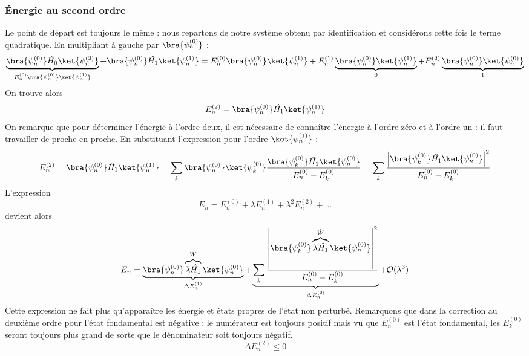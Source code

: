 		\subsubsection{Énergie au second ordre}
		Le point de départ est toujours le même :  nous repartons de notre 
		système obtenu par identification et considérons cette fois le terme
		quadratique. En multipliant à gauche par $\bra{\psi_n^{(0)}}$ :
		\begin{equation}
		\underbrace{\bra{\psi_n^{(0)}}\hat{H_0}\ket{\psi_n^{(2)}}}_{E_n^{(0
		)}\bra{\psi_n^{(0)}}\ket{\psi_n^{(1)}}}+\bra{\psi_n^{(0)}}\hat{H_1}\ket{\psi_n^{(1)}} =
		 E_n^{(0	)}\bra{\psi_n^{(0)}}\ket{\psi_n^{(1)}}+E_n^{(1)}\underbrace{
		 \bra{\psi_n^{(0)}}\ket{\psi_n^{(1)}}}_{0}+E_n^{(2)}
		\underbrace{\bra{\psi_n^{(0)}}\ket{\psi_n^{(0)}}}_{1}
		\end{equation}
		On trouve alors
		\begin{equation}
		E_n^{(2)} = \bra{\psi_n^{(0)}}\hat{H_1}\ket{\psi_n^{(1)}}
		\end{equation}
		On remarque que pour déterminer l'énergie à l'ordre deux, il est nécessaire de 
		connaître l'énergie à l'ordre zéro et à l'ordre un : il faut travailler de proche
		en proche. En substituant l'expression pour l'ordre $\ket{\psi_n^{(1)}}$ : 
		\begin{equation}
		E_n^{(2)} = \bra{\psi_n^{(0)}}\hat{H_1}\ket{\psi_n^{(1)}} = \sum_k
		\bra{\psi_n^{(0)}}\ket{\psi_k^{(0)}}
		\dfrac{\bra{\psi_k^{(0)}}\hat{H_1}\ket{\psi_n^{(0)}}}{	E_n^{(0)}-E_k^{(0)}} =
		\sum_k \dfrac{\left|\bra{\psi_k^{(0)}}\hat{H_1}\ket{\psi_n^{(0)}}\right|^2}
		{E_n^{(0)}-E_k^{(0)}}
		\end{equation}
		L'expression
		\begin{equation}
		E_n = E_n^{(0)}+\lambda E_n^{(1)}+\lambda^2E_n^{(2)}+\dots
		\end{equation}
		devient alors
		\begin{equation}
		E_n = \underbrace{\bra{\psi_n^{(0)}}\overbrace{\lambda\hat{H_1}}^{\hat{W}}\ket{\psi_n^{(0)}}}_{\Delta 
		E_n^{(1)}}
		 + 
		\underbrace{\sum_k \dfrac{\left|\bra{\psi_k^{(0)}}\overbrace{\lambda\hat{H_1}}^{\hat{W}}\ket{\psi_n^{(0)}}\right|^2}
		{E_n^{(0)}-E_k^{(0)}}}_{\Delta 
		E_n^{(2)}} +
		\mathcal{O}(\lambda^3)
		\end{equation}	
		Cette expression ne fait plus qu'apparaître les énergie et états propres de 
		l'état non perturbé. Remarquons que dans la correction au 	deuxième ordre pour 
		l'état fondamental est négative : le numérateur est toujours positif mais vu 
		que $E_n^{(0)}$ est l'état fondamental, les $E_k^{(0)}$ seront toujours plus grand 
		de sorte que le dénominateur soit toujours négatif.
		\begin{equation}
		\Delta E_n^{(2)} \leq 0
		\end{equation}
		
